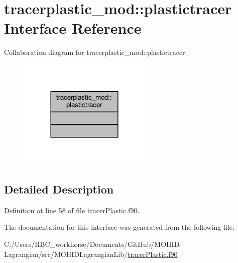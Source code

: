 \hypertarget{interfacetracerplastic__mod_1_1plastictracer}{}\section{tracerplastic\+\_\+mod\+:\+:plastictracer Interface Reference}
\label{interfacetracerplastic__mod_1_1plastictracer}


Collaboration diagram for tracerplastic\+\_\+mod\+:\+:plastictracer\+:\nopagebreak
\begin{figure}[H]
\begin{center}
\leavevmode
\includegraphics[width=180pt]{interfacetracerplastic__mod_1_1plastictracer__coll__graph}
\end{center}
\end{figure}


\subsection{Detailed Description}


Definition at line 58 of file tracer\+Plastic.\+f90.



The documentation for this interface was generated from the following file\+:\begin{DoxyCompactItemize}
\item 
C\+:/\+Users/\+R\+B\+C\+\_\+workhorse/\+Documents/\+Git\+Hub/\+M\+O\+H\+I\+D-\/\+Lagrangian/src/\+M\+O\+H\+I\+D\+Lagrangian\+Lib/\mbox{\hyperlink{tracer_plastic_8f90}{tracer\+Plastic.\+f90}}\end{DoxyCompactItemize}
